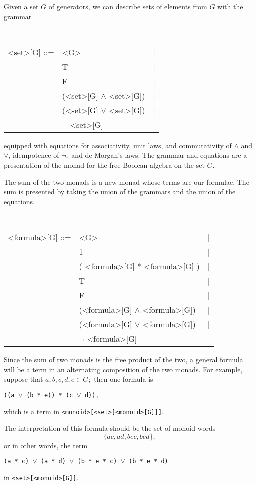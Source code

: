 \documentclass{article}
\begin{document}
Given a set $G$ of generators, we can describe sets of elements from $G$ with the grammar
\begin{center}
  \tt
  \begin{tabular}{rll}
    <set>[G] ::= & <G> &|\\
    & T &| \\
    & F &| \\
    & (<set>[G] $\land$ <set>[G]) &| \\
    & (<set>[G] $\lor$ <set>[G]) &| \\
    & $\neg$ <set>[G]
  \end{tabular}
\end{center}
equipped with equations for associativity, unit laws, and commutativity of $\land$ and $\lor$, idempotence of $\neg,$ and de Morgan's laws.  The grammar and equations are a presentation of the monad for the free Boolean algebra on the set $G.$

The sum of the two monads is a new monad whose terms are our formulae.  The sum is presented by taking the union of the grammars and the union of the equations.
\begin{center}
  \tt
  \begin{tabular}{rll}
    <formula>[G] ::= & <G> &| \\
    & 1 &| \\
    & ( <formula>[G] * <formula>[G] ) &|\\
    & T &|\\
    & F &| \\
    & (<formula>[G] $\land$ <formula>[G]) &| \\
    & (<formula>[G] $\lor$ <formula>[G]) &| \\
    & $\neg$ <formula>[G]
  \end{tabular}
\end{center}
Since the sum of two monads is the free product of the two, a general formula will be a term in an alternating composition of the two monads.  For example, suppose that $a, b, c, d, e \in G;$ then one formula is 
\begin{center}
  \tt ((a $\lor$ (b * e)) * (c $\lor$ d)),
\end{center}
which is a term in {\tt <monoid>[<set>[<monoid>[G]]]}.  

The interpretation of this formula should be the set of monoid words
\[ \{ ac, ad, bec, bed \}, \]
or in other words, the term
\begin{center}
  \tt (a * c) $\lor$ (a * d) $\lor$ (b * e * c) $\lor$ (b * e * d)
\end{center}
in {\tt <set>[<monoid>[G]]}.  
\end{document}

